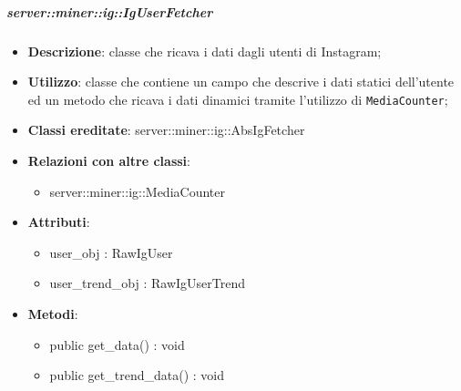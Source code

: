 	\subparagraph{server::miner::ig::IgUserFetcher} %
		\label{subp:server_miner_ig_IgUserFetcher}
			\begin{itemize}
				\item \textbf{Descrizione}: classe che ricava i dati dagli utenti di Instagram;
				\item \textbf{Utilizzo}: classe che contiene un campo che descrive i dati statici dell'utente ed un metodo che ricava i dati dinamici tramite l'utilizzo di \texttt{MediaCounter};
				\item \textbf{Classi ereditate}: server::miner::ig::AbsIgFetcher
				\item \textbf{Relazioni con altre classi}:
					\begin{itemize}
						\item server::miner::ig::MediaCounter
					\end{itemize}
				\item \textbf{Attributi}:    
					\begin{itemize}
						\item user\_obj : RawIgUser
						\item user\_trend\_obj : RawIgUserTrend
					\end{itemize}
				\item \textbf{Metodi}:  
					\begin{itemize}
						\item public get\_data() : void
						\item public get\_trend\_data() : void
					\end{itemize}
			\end{itemize}

